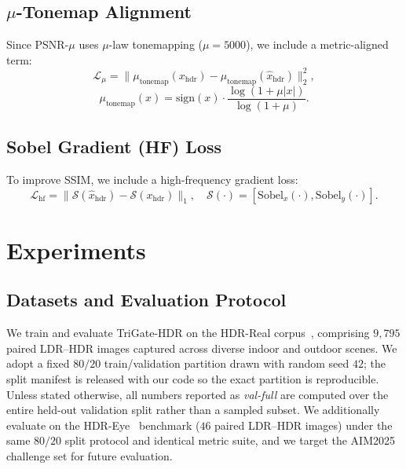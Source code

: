 \documentclass[10pt,twocolumn,letterpaper]{article}
\newcommand{\xhdr}{x_{\mathrm{hdr}}}
\begin{document}
\subsection{$\mu$-Tonemap Alignment}

Since PSNR-$\mu$ uses $\mu$-law tonemapping ($\mu=5000$), we include a metric-aligned term:
\begin{equation}
\mathcal{L}_{\mu} = \|\mu_{\mathrm{tonemap}}(\xhdr) - \mu_{\mathrm{tonemap}}(\hat x_{\mathrm{hdr}})\|_2^2,
\label{eq:mu-loss}
\end{equation}
\begin{equation}
\mu_{\mathrm{tonemap}}(x) = \mathrm{sign}(x)\cdot\frac{\log(1+\mu|x|)}{\log(1+\mu)}.
\label{eq:mu-tonemap}
\end{equation}

\subsection{Sobel Gradient (HF) Loss}

To improve SSIM, we include a high-frequency gradient loss:
\begin{equation}
\mathcal{L}_{\mathrm{hf}} = \|\mathcal{S}(\hat x_{\mathrm{hdr}}) - \mathcal{S}(\xhdr)\|_1, \quad \mathcal{S}(\cdot) = [\mathrm{Sobel}_x(\cdot), \mathrm{Sobel}_y(\cdot)].
\label{eq:hf-loss}
\end{equation}

\section{Experiments}
\label{sec:experiments}

\subsection{Datasets and Evaluation Protocol}

We train and evaluate TriGate-HDR on the HDR-Real corpus~\cite{singlehdr}, comprising $9{,}795$ paired LDR--HDR images captured across diverse indoor and outdoor scenes. We adopt a fixed $80/20$ train/validation partition drawn with random seed $42$; the split manifest is released with our code so the exact partition is reproducible. Unless stated otherwise, all numbers reported as \emph{val-full} are computed over the entire held-out validation split rather than a sampled subset. We additionally evaluate on the HDR-Eye~\cite{hdreye} benchmark ($46$ paired LDR--HDR images) under the same $80/20$ split protocol and identical metric suite, and we target the AIM2025 challenge set for future evaluation.
\end{document}
